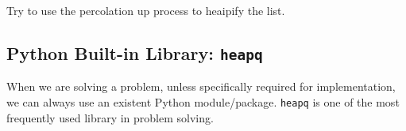 \documentclass[../main.tex]{subfiles}
\begin{document}
\begin{bclogo}[couleur = blue!30, arrondi=0.1,logo=\bccrayon,ombre=true]{Try to use the percolation up process to heaipify the list. } 
\end{bclogo}

\subsection{Python Built-in Library: \texttt{heapq}}
When we are solving a problem, unless specifically required for implementation, we can always use an existent Python module/package. \texttt{heapq} is one of the most frequently used library in problem solving. 
\end{document}
